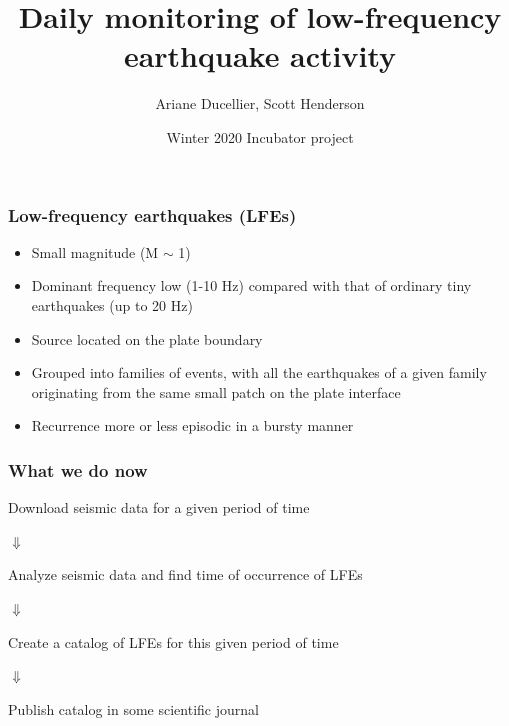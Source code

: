 \documentclass{beamer}
\title[Daily monitoring of low-frequency earthquake activity]{Daily monitoring of low-frequency earthquake activity}
\author{Ariane Ducellier, Scott Henderson}
\date{Winter 2020 Incubator project}
\begin{document}
	\begin{frame}
		\titlepage
	\end{frame}

	\begin{frame}
		\frametitle{Low-frequency earthquakes (LFEs)}
		\begin{itemize}
			\item Small magnitude (M $\sim$ 1)
			\item Dominant frequency low (1-10 Hz) compared with that of ordinary tiny earthquakes (up to 20 Hz)
			\item Source located on the plate boundary
			\item Grouped into families of events, with all the earthquakes of a given family originating from the same small patch on the plate interface
			\item Recurrence more or less episodic in a bursty manner
		\end{itemize}
	\end{frame}

	\begin{frame}
		\frametitle{What we do now}
		\begin{exampleblock}{}
		\centering
		\normalsize{
		Download seismic data for a given period of time
		}
		\end{exampleblock}

		\centering
		\Huge{
		$\Downarrow$
		}

		\begin{exampleblock}{}
		\centering
		\normalsize{
		Analyze seismic data and find time of occurrence of LFEs
		}
		\end{exampleblock}

		\centering
		\Huge{
		$\Downarrow$
		}

		\begin{exampleblock}{}
		\centering
		\normalsize{
		Create a catalog of LFEs for this given period of time	
		}
		\end{exampleblock}

		\centering
		\Huge{
		$\Downarrow$
		}

		\begin{exampleblock}{}
		\centering
		\normalsize{
		Publish catalog in some scientific journal
		}	
		\end{exampleblock}
	\end{frame}
\end{document}
